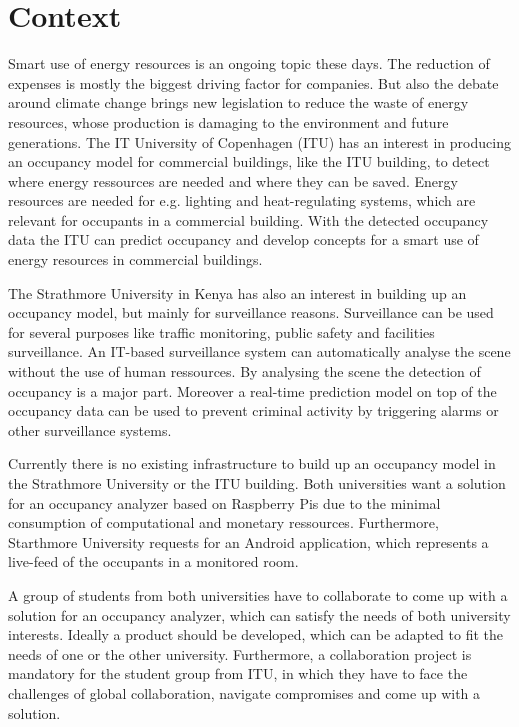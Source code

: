 \section{Context}
\label{sec:Context}


Smart use of energy resources is an ongoing topic these days. The reduction of expenses is mostly the biggest driving factor for companies. But also the debate around climate change brings new legislation to reduce the waste of energy resources, whose production is damaging to the environment and future generations. The IT University of Copenhagen (ITU) has an interest in producing an occupancy model for commercial buildings, like the ITU building, to detect where energy ressources are needed and where they can be saved. Energy resources are needed for e.g. lighting and heat-regulating systems, which are relevant for occupants in a commercial building. With the detected occupancy data the ITU can predict occupancy and develop concepts for a smart use of energy resources in commercial buildings.

The Strathmore University in Kenya has also an interest in building up an occupancy model, but mainly for surveillance reasons. Surveillance can be used for several purposes like traffic monitoring, public safety and facilities surveillance. An IT-based surveillance system can automatically analyse the scene without the use of human ressources. By analysing the scene the detection of occupancy is a major part. Moreover a real-time prediction model on top of the occupancy data can be used to prevent criminal activity by triggering alarms or other surveillance systems.

Currently there is no existing infrastructure to build up an occupancy model in the Strathmore University or the ITU building. Both universities want a solution for an occupancy analyzer based on Raspberry Pis due to the minimal consumption of computational and monetary ressources. Furthermore, Starthmore University requests for an Android application, which represents a live-feed of the occupants in a monitored room.

A group of students from both universities have to collaborate to come up with a solution for an occupancy analyzer, which can satisfy the needs of both university interests. Ideally a product should be developed, which can be adapted to fit the needs of one or the other university.
Furthermore, a collaboration project is mandatory for the student group from ITU, in which they have to face the challenges of global collaboration, navigate compromises and come up with a solution.

